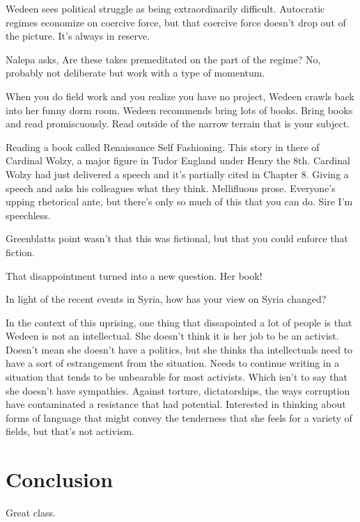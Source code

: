 \documentclass{article}
\begin{document}
\vspace{5mm}

Wedeen sees political struggle as being extraordinarily difficult.  Autocratic regimes economize on coercive force, but that coercive force doesn't drop out of the picture.  It's always in reserve.  

\vspace{5mm}

Nalepa asks, Are these takes premeditated on the part of the regime?  No, probably not deliberate but work with a type of momentum.  

\vspace{5mm}

When you do field work and you realize you have no project, Wedeen crawls back into her funny dorm room.  Wedeen recommends bring lots of books.  Bring books and read promiscuously.  Read outside of the narrow terrain that is your subject.  

\vspace{5mm}

Reading a book called Renaissance Self Fashioning.  This story in there of Cardinal Wolzy, a major figure in Tudor England under Henry the 8th.  Cardinal Wolzy had just delivered a speech and it's partially cited in Chapter 8.  Giving a speech and asks his colleagues what they think.  Mellifluous prose.  Everyone's upping rhetorical ante, but there's only so much of this that you can do.  Sire I'm speechless.  

\vspace{5mm}

Greenblatts point wasn't that this was fictional, but that you could enforce that fiction.  

\vspace{5mm}

That disappointment turned into a new question.  Her book!  

\vspace{5mm}

In light of the recent events in Syria, how has your view on Syria changed?  

\vspace{5mm}

In the context of this uprising, one thing that dissapointed a lot of people is that Wedeen is not an intellectual.  She doesn't think it is her job to be an activist.  Doesn't mean she doesn't have a politics, but she thinks tha intellectuals need to have a sort of estrangement from the situation.  Needs to continue writing in a situation that tends to be unbearable for most activists.  Which isn't to say that she doesn't have sympathies.  Against torture, dictatorships, the ways corruption have contaminated a resistance that had potential.  Interested in thinking about forms of language that might convey the tenderness that she feels for a variety of fields, but that's not activism.  


\section{Conclusion}
Great class.  
\end{document}
